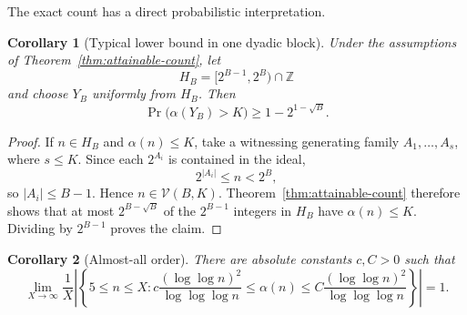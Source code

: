 \documentclass[11pt]{article}
\newtheorem{corollary}[corollary]{Corollary}
\theoremstyle{definition}
\theoremstyle{remark}
\newcommand{\V}{\mathcal V}
\begin{document}
The exact count has a direct probabilistic interpretation.

\begin{corollary}[Typical lower bound in one dyadic block]\label{cor:block-probability}
Under the assumptions of Theorem~\ref{thm:attainable-count}, let
\[
  H_B=[2^{B-1},2^B)\cap\mathbb Z
\]
and choose $Y_B$ uniformly from $H_B$. Then
\[
  \Pr\bigl(\alpha(Y_B)>K\bigr)\ge 1-2^{1-\sqrt B}.
\]
\end{corollary}

\begin{proof}
If $n\in H_B$ and $\alpha(n)\le K$, take a witnessing generating family
$A_1,\ldots,A_s$, where $s\le K$. Since each $2^{A_i}$ is contained in
the ideal,
\[
  2^{|A_i|}\le n<2^B,
\]
so $|A_i|\le B-1$. Hence $n\in\V(B,K)$. Theorem~\ref{thm:attainable-count}
therefore shows that at most $2^{B-\sqrt B}$ of the $2^{B-1}$ integers in
$H_B$ have $\alpha(n)\le K$. Dividing by $2^{B-1}$ proves the claim.
\end{proof}

\begin{corollary}[Almost-all order]\label{cor:almost-all-order}
There are absolute constants $c,C>0$ such that
\[
  \lim_{X\to\infty}\frac1X
    \left|\left\{5\le n\le X:
  c\frac{(\log\log n)^2}{\log\log\log n}
  \le \alpha(n)\le
  C\frac{(\log\log n)^2}{\log\log\log n}
  \right\}\right|=1.
\]
\end{corollary}
\end{document}
